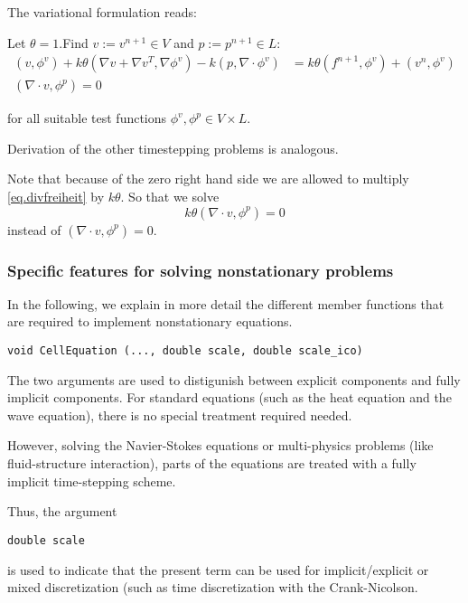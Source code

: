 The variational formulation reads:

\begin{Problem}
Let $\theta =1$.Find $v:= v^{n+1}\in V$ and $p:= p^{n+1}\in L$:
\begin{align}
(v,\phi^v) + k\theta (\nabla v + \nabla v^{T}, \nabla\phi^v) 
- k  (p, \nabla\cdot\phi^v) &=
k\theta (f^{n+1},\phi^v) +  (v^n,\phi^v)\\
(\nabla \cdot v,\phi^p) = 0  \label{eq.divfreiheit}
\end{align}
\end{Problem}
for all suitable test functions ${\phi^v , \phi^p} \in V\times L$. 


Derivation of the other timestepping problems is analogous.
\begin{remark}
Note that because of the zero right hand side we are allowed to multiply \eqref{eq.divfreiheit} by $k\theta$. So that we solve $$k\theta(\nabla \cdot v,\phi^p) = 0$$ instead of $(\nabla \cdot v,\phi^p) = 0$. 
\end{remark}


\subsubsection{Specific features for 
solving nonstationary problems}

In the following, we explain in more detail the 
different member functions that are required to
implement nonstationary equations.

\begin{verbatim}
void CellEquation (..., double scale, double scale_ico)
\end{verbatim}
The two arguments 
are used to distigunish between explicit 
components and fully implicit components. 
For standard equations (such as the heat 
equation and the wave equation), there is 
no special treatment required needed. 

However, solving the Navier-Stokes equations or 
multi-physics problems (like fluid-structure
interaction), parts of the equations are treated
with a fully implicit time-stepping scheme.

Thus, the argument
\begin{verbatim}
double scale
\end{verbatim}
is used to indicate that the present term 
can be used for implicit/explicit or mixed 
discretization (such as time discretization with
the Crank-Nicolson.

